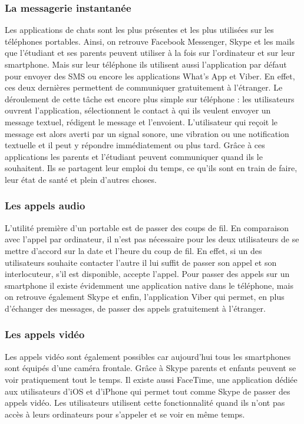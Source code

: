 \documentclass[12pt]{article}
\begin{document}
\subsubsection{La messagerie instantanée}
Les applications de chats sont les plus présentes et les plus utilisées sur les téléphones portables. Ainsi, on retrouve Facebook Messenger, Skype et les mails que l'étudiant et ses parents peuvent utiliser à la fois sur l'ordinateur et sur leur smartphone. Mais sur leur téléphone ils utilisent aussi l'application par défaut pour envoyer des SMS ou encore les applications What's App et Viber. En effet, ces deux dernières permettent de communiquer gratuitement à l'étranger. Le déroulement de cette tâche est encore plus simple sur téléphone : les utilisateurs ouvrent l'application, sélectionnent le contact à qui ils veulent envoyer un message textuel, rédigent le message et l'envoient. L'utilisateur qui reçoit le message est alors averti par un signal sonore, une vibration ou une notification textuelle et il peut y répondre immédiatement ou plus tard. Grâce à ces applications les parents et l'étudiant peuvent communiquer quand ils le souhaitent. Ils se partagent leur emploi du temps, ce qu'ils sont en train de faire, leur état de santé et plein d'autres choses. ~\\
 
 \subsubsection{Les appels audio}
L'utilité première d'un portable est de passer des coups de fil. En comparaison avec l'appel par ordinateur, il n'est pas nécessaire pour les deux utilisateurs de se mettre d'accord sur la date et l'heure du coup de fil. En effet, si un des utilisateurs souhaite contacter l'autre il lui suffit de passer son appel et son interlocuteur, s'il est disponible, accepte l'appel. Pour passer des appels sur un smartphone il existe évidemment une application native dans le téléphone,  mais on retrouve également Skype et enfin, l'application Viber qui permet, en plus d'échanger des messages, de passer des appels gratuitement à l'étranger.~\\

 \subsubsection{Les appels vidéo}
Les appels vidéo sont également possibles car aujourd'hui tous les smartphones sont équipés d'une caméra frontale. Grâce à Skype parents et enfants peuvent se voir pratiquement tout le temps. Il existe aussi FaceTime, une application dédiée aux utilisateurs d'iOS et d'iPhone qui permet tout comme Skype de passer des appels vidéo. Les utilisateurs utilisent cette fonctionnalité quand ils n'ont pas accès à leurs ordinateurs pour s'appeler et se voir en même temps.~\\
\end{document}

